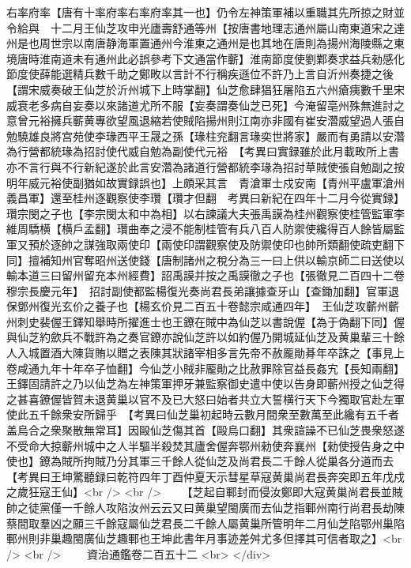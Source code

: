 右率府率【唐有十率府率右率府率其一也】仍令左神策軍補以重職其先所掠之財並令給與　十二月王仙芝攻申光廬壽舒通等州【按唐書地理志通州屬山南東道宋之達州是也周世宗以南唐静海軍置通州今淮東之通州是也其地在唐則為揚州海陵縣之東境唐時淮南道未有通州此必誤參考下文通當作蘄】淮南節度使劉鄴奏求益兵勑感化節度使薛能選精兵數千助之鄭畋以言計不行稱疾遜位不許乃上言自沂州奏捷之後【謂宋威奏破王仙芝於沂州城下上時掌翻】仙芝愈肆猖狂屠陷五六州瘡痍數千里宋威衰老多病自妄奏以來諸道尤所不服【妄奏謂奏仙芝已死】今淹留亳州殊無進討之意曾元裕擁兵蘄黄專欲望風退縮若使賊陷揚州則江南亦非國有崔安濳威望過人張自勉驍雄良將宫苑使李瑑西平王晟之孫【瑑柱兖翻言瑑奕世將家】嚴而有勇請以安濳為行營都統瑑為招討使代威自勉為副使代元裕　【考異曰實録雖於此月載畋所上書亦不言行與不行新紀遂於此言安濳為諸道行營都統李瑑為招討草賊使張自勉副之按明年威元裕使副猶如故實録誤也】上頗采其言　青滄軍士戍安南【青州平盧軍滄州義昌軍】還至桂州逐觀察使李瓚【瓚才但翻　考異曰新紀在四年十二月今從實録】瓚宗閔之子也【李宗閔太和中為相】以右諫議大夫張禹謨為桂州觀察使桂管監軍李維周驕横【横戶孟翻】瓚曲奉之浸不能制桂管有兵八百人防禦使纔得百人餘皆屬監軍又預於逐帥之謀強取兩使印【兩使印謂觀察使及防禦使印也帥所類翻使疏吏翻下同】擅補知州官奪昭州送使錢【唐制諸州之稅分為三一曰上供以輸京師二曰送使以輸本道三曰留州留充本州經費】詔禹謨并按之禹謨徹之子也【張徹見二百四十二卷穆宗長慶元年】　招討副使都監楊復光奏尚君長弟讓據查牙山【查鋤加翻】官軍退保鄧州復光玄价之養子也【楊玄价見二百五十卷懿宗咸通四年】　王仙芝攻蘄州蘄州刺史裴偓王鐸知舉時所擢進士也王鐐在賊中為仙芝以書說偓【為于偽翻下同】偓與仙芝約歛兵不戰許為之奏官鐐亦說仙芝許以如約偓乃開城延仙芝及黄巢輩三十餘人入城置酒大陳貨賄以贈之表陳其狀諸宰相多言先帝不赦龎勛朞年卒誅之【事見上卷咸通九年十年卒子恤翻】今仙芝小賊非龎勛之比赦罪除官益長姦宄【長知兩翻】王鐸固請許之乃以仙芝為左神策軍押牙兼監察御史遣中使以告身即蘄州授之仙芝得之甚喜鐐偓皆賀未退黄巢以官不及已大怒曰始者共立大誓横行天下今獨取官赴左軍使此五千餘衆安所歸乎　【考異曰仙芝巢初起時云數月間衆至數萬至此纔有五千者盖烏合之衆聚散無常耳】因毆仙芝傷其首【毆烏口翻】其衆諠譟不已仙芝畏衆怒遂不受命大掠蘄州城中之人半驅半殺焚其廬舍偓奔鄂州勑使奔襄州【勑使授告身之中使也】鐐為賊所拘賊乃分其軍三千餘人從仙芝及尚君長二千餘人從巢各分道而去【考異曰王坤驚聽録曰乾符四年丁酉仲夏天示彗星草寇黄巢尚君長奔突即五年戊戍之歲狂寇王仙】<br />
<br />
　　【芝起自鄆封而侵汝鄭即大寇黄巢尚君長並賊帥之徒黨僅一千餘人攻陷汝州云云又曰黄巢望閩廣而去仙芝指鄆州南行尚君長劫陳蔡間取羣凶之願三千餘寇屬仙芝君長二千餘人屬黄巢所管明年二月仙芝陷鄂州巢陷鄆州則非巢趣閩廣仙芝趣鄆也王坤此書年月事迹差舛尤多但擇其可信者取之】<br />
<br />
　　資治通鑑卷二百五十二  <br>
   </div> 

